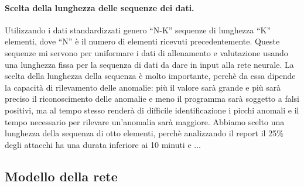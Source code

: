 \paragraph{Scelta della lunghezza delle sequenze dei dati.} Utilizzando i dati standardizzati genero ``N-K'' sequenze di lunghezza ``K'' elementi, dove ``N'' è il numero di elementi ricevuti precedentemente. Queste sequenze mi servono per uniformare i dati di allenamento e valutazione usando una lunghezza fissa per la sequenza di dati da dare in input alla rete neurale.
La scelta della lunghezza della sequenza è molto importante, perchè da essa dipende la capacità di rilevamento delle anomalie: più il valore sarà grande e più sarà preciso il riconoscimento delle anomalie e meno il programma sarà soggetto a falsi positivi, ma al tempo stesso renderà di difficile identificazione i picchi anomali e il tempo necessario per rilevare un'anomalia sarà maggiore.
Abbiamo scelto una lunghezza della sequenza di otto elementi, perchè analizzando il report \cite{imperva_ddos_report} il 25\% degli attacchi ha una durata inferiore ai 10 minuti e ...

\subsection{Modello della rete}


